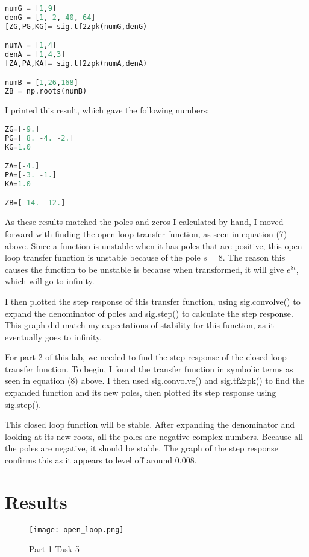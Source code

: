 \documentclass[12pt]{report}
\begin{document}
 \begin{lstlisting}[language=Python]
numG = [1,9]
denG = [1,-2,-40,-64]
[ZG,PG,KG]= sig.tf2zpk(numG,denG)

numA = [1,4]
denA = [1,4,3]
[ZA,PA,KA]= sig.tf2zpk(numA,denA)

numB = [1,26,168]
ZB = np.roots(numB)
\end{lstlisting}

I printed this result, which gave the following numbers: 
\begin{lstlisting}[language=Python]
ZG=[-9.]
PG=[ 8. -4. -2.]
KG=1.0

ZA=[-4.]
PA=[-3. -1.]
KA=1.0

ZB=[-14. -12.]
\end{lstlisting}

As these results matched the poles and zeros I calculated by hand, I moved forward with finding the open loop transfer function, as seen in equation (7) above. Since a function is unstable when it has poles that are positive, this open loop transfer function is unstable because of the pole $s=8$. The reason this causes the function to be unstable is because when transformed, it will give $e^{8t}$, which will go to infinity. 

I then plotted the step response of this transfer function, using sig.convolve() to expand the denominator of poles and sig.step() to calculate the step response. This graph did match my expectations of stability for this function, as it eventually goes to infinity.

For part 2 of this lab, we needed to find the step response of the closed loop transfer function. To begin, I found the transfer function in symbolic terms as seen in equation (8) above. I then used sig.convolve() and sig.tf2zpk() to find the expanded function and its new poles, then plotted its step response using sig.step().

This closed loop function will be stable. After expanding the denominator and looking at its new roots, all the poles are negative complex numbers. Because all the poles are negative, it should be stable. The graph of the step response confirms this as it appears to level off around 0.008.
 
 \section{Results}
 
 \begin{figure}[H]
    \centering
    \texttt{[image: open\_loop.png]}
    \caption{Part 1 Task 5}
\end{figure}
\end{document}

